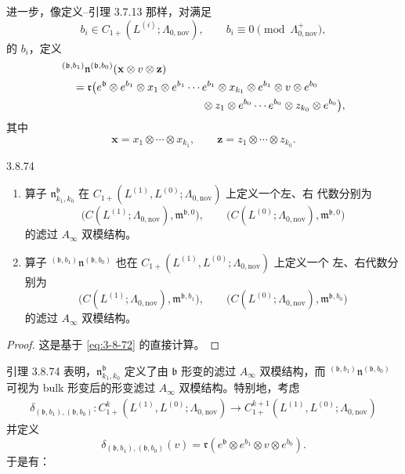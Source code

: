进一步，像定义--引理 3.7.13 那样，对满足
\[
 b_i\in C_{1+}(L^{(i)};\Lambda_{0,\mathrm{nov}}),
 \qquad
 b_i\equiv0\pmod{\Lambda^+_{0,\mathrm{nov}}},
\]
的 $b_i$，定义
\[
\begin{aligned}
 &{}^{(\mathfrak b,b_1)}
 \mathfrak n^{(\mathfrak b,b_0)}
 (\mathbf x\otimes v\otimes\mathbf z)\\
 &\quad=
 \mathfrak r\bigl(
 e^{\mathfrak b}\otimes
 e^{b_1}\otimes x_1\otimes e^{b_1}\cdots
 e^{b_1}\otimes x_{k_1}\otimes e^{b_1}
 \otimes v\otimes e^{b_0}\\
 &\hspace{45mm}{}
 \otimes z_1\otimes e^{b_0}\cdots
 e^{b_0}\otimes z_{k_0}\otimes e^{b_0}
 \bigr),
\end{aligned}
\]
其中
\[
 \mathbf x=x_1\otimes\cdots\otimes x_{k_1},
 \qquad
 \mathbf z=z_1\otimes\cdots\otimes z_{k_0}.
\]

\begin{lemma}{3.8.74}\label{lem:3-8-74}
\begin{enumerate}[label=\textup{(\arabic*)},leftmargin=2.8em]
\item 算子 $\mathfrak n^{\mathfrak b}_{k_1,k_0}$ 在
$C_{1+}(L^{(1)},L^{(0)};\Lambda_{0,\mathrm{nov}})$ 上定义一个左、右
代数分别为
\[
 \bigl(C(L^{(1)};\Lambda_{0,\mathrm{nov}}),
       \mathfrak m^{\mathfrak b,0}\bigr),
 \qquad
 \bigl(C(L^{(0)};\Lambda_{0,\mathrm{nov}}),
       \mathfrak m^{\mathfrak b,0}\bigr)
\]
的滤过 $A_\infty$ 双模结构。

\item 算子
$ {}^{(\mathfrak b,b_1)}
\mathfrak n^{(\mathfrak b,b_0)}$
也在 $C_{1+}(L^{(1)},L^{(0)};\Lambda_{0,\mathrm{nov}})$ 上定义一个
左、右代数分别为
\[
 \bigl(C(L^{(1)};\Lambda_{0,\mathrm{nov}}),
       \mathfrak m^{\mathfrak b,b_1}\bigr),
 \qquad
 \bigl(C(L^{(0)};\Lambda_{0,\mathrm{nov}}),
       \mathfrak m^{\mathfrak b,b_0}\bigr)
\]
的滤过 $A_\infty$ 双模结构。
\end{enumerate}
\end{lemma}

\begin{proof}
这是基于 \eqref{eq:3-8-72} 的直接计算。
\end{proof}

引理 3.8.74 表明，$\mathfrak n^{\mathfrak b}_{k_1,k_0}$ 定义了由
$\mathfrak b$ 形变的滤过 $A_\infty$ 双模结构，而
$ {}^{(\mathfrak b,b_1)}
\mathfrak n^{(\mathfrak b,b_0)}$
可视为 bulk 形变后的形变滤过 $A_\infty$ 双模结构。特别地，考虑
\[
\begin{aligned}
 \delta_{(\mathfrak b,b_1),(\mathfrak b,b_0)}
 \colon
 C_{1+}^k(L^{(1)},L^{(0)};\Lambda_{0,\mathrm{nov}})
 \longrightarrow
 C_{1+}^{k+1}(L^{(1)},L^{(0)};\Lambda_{0,\mathrm{nov}})
\end{aligned}
\]
并定义
\[
 \delta_{(\mathfrak b,b_1),(\mathfrak b,b_0)}(v)
 =
 \mathfrak r(
 e^{\mathfrak b}\otimes e^{b_1}\otimes v\otimes e^{b_0}
 ).
\]
于是有：

